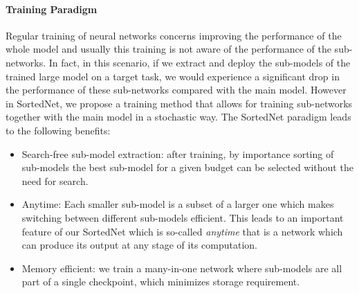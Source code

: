 \documentclass[letterpaper]{article} %
\begin{document}


\paragraph{Training Paradigm}
Regular training of neural networks concerns improving the performance of the whole model and usually this training is not aware of the performance of the sub-networks. In fact, in this scenario, if we extract and deploy the sub-models of the trained large model on a target task, we would experience a significant drop in the performance of these sub-networks compared with the main model. 
However in SortedNet, we propose a training method that allows for training sub-networks together with the main model in a stochastic way. 
The SortedNet paradigm leads to the following benefits: 
\begin{itemize}
    \item Search-free sub-model extraction: after training, by importance sorting of sub-models the best sub-model for a given budget can be selected without the need for search. 
    
    \item Anytime: Each smaller sub-model is a subset of a larger one which makes switching between different sub-models efficient.
    This leads to an important feature of our SortedNet which is so-called \textit{anytime} that is a network which can produce its output at any stage of its computation. 
    
    \item Memory efficient:  we train a many-in-one network where sub-models are all part of a single checkpoint, which minimizes storage requirement.
\end{itemize}
\end{document}
